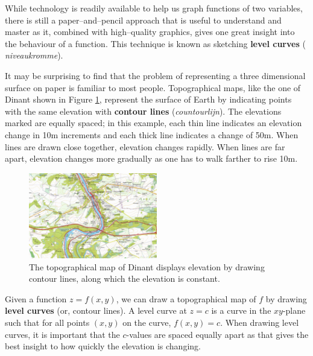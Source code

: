 While technology is readily available to help us graph functions of two variables, there is still a paper--and--pencil approach that is useful to understand and master as it, combined with high--quality graphics, gives one great insight into the behaviour of a function. This technique is known as sketching \textbf{level curves} (\textit{ niveaukromme}).

It may be surprising to find that the problem of representing a three dimensional surface on paper is familiar to most people. Topographical maps, like the one of Dinant shown in Figure \ref{fig_multi_var_3}, represent the surface of Earth by indicating points with the same elevation with \textbf{contour lines} (\textit{countourlijn}). The elevations marked are equally spaced; in this example, each thin line indicates an elevation change in 10m increments and each thick line indicates a change of 50m. When lines are drawn close together, elevation changes rapidly. When lines are far apart,  elevation changes more gradually as one has to walk farther to rise 10m.

\begin{figure}
	\begin{center}
			\includegraphics[width=0.5\textwidth]{fig_multi_var_3}
	\caption{The topographical map of Dinant displays elevation by drawing contour lines, along which the elevation is constant.}
	\label{fig_multi_var_3}
	\end{center}
\end{figure}

Given a function $z=f(x,y)$, we can draw a topographical map of $f$ by drawing \textbf{level curves} (or, contour lines). A level curve at $z=c$ is a curve in the $xy$-plane such that for all points $(x,y)$ on the curve, $f(x,y) = c$.  When drawing level curves, it is important that the $c$-values are spaced equally apart as that gives the best insight to how quickly the elevation is changing. 

